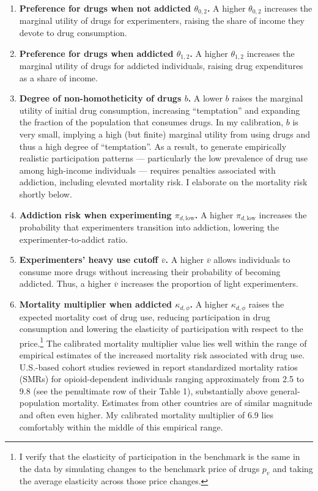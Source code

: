 \documentclass[parskip=full]{article}
\theoremstyle{plain}
\theoremstyle{definition}
\theoremstyle{remark}
\begin{document}
\begin{enumerate}
\item \textbf{Preference for drugs when not addicted $\theta_{0,2}$.} A higher $\theta_{0,2}$ increases the marginal utility of drugs for experimenters, raising the share of income they devote to drug consumption.

\item \textbf{Preference for drugs when addicted $\theta_{1,2}$.} A higher $\theta_{1,2}$ increases the marginal utility of drugs for addicted individuals, raising drug expenditures as a share of income.

\item \textbf{Degree of non-homotheticity of drugs $b$.} 
A lower $b$ raises the marginal utility of initial drug consumption, increasing ``temptation'' and expanding the fraction of the population that consumes drugs. In my calibration, $b$ is very small, implying a high (but finite) marginal utility from using drugs and thus a high degree of ``temptation''. As a result, to generate empirically realistic participation patterns — particularly the low prevalence of drug use among high-income individuals — requires penalties associated with addiction, including elevated mortality risk. I elaborate on the mortality risk shortly below.

\item \textbf{Addiction risk when experimenting $\pi_{d,\text{low}}$.} A higher $\pi_{d,\text{low}}$ increases the probability that experimenters transition into addiction, lowering the experimenter-to-addict ratio.

\item \textbf{Experimenters' heavy use cutoff $\overline{v}$.} A higher $\overline{v}$ allows individuals to consume more drugs without increasing their probability of becoming addicted. Thus, a higher $\overline{v}$ increases the proportion of light experimenters.

\item \textbf{Mortality multiplier when addicted $\kappa_{d,\phi}$.} A higher $\kappa_{d,\phi}$ raises the expected mortality cost of drug use, reducing participation in drug consumption and lowering the elasticity of participation with respect to the price.\footnote{I verify that the elasticity of participation in the benchmark is the same in the data by simulating changes to the benchmark price of drugs $p_v$ and taking the average elasticity across those price changes.} The calibrated mortality multiplier value lies well within the range of empirical estimates of the increased mortality risk associated with drug use. U.S.-based cohort studies reviewed in \citet{degenhardt2010mortality} report standardized mortality ratios (SMRs) for opioid-dependent individuals ranging approximately from 2.5 to 9.8 (see the penultimate row of their Table 1), substantially above general-population mortality. Estimates from other countries are of similar magnitude and often even higher. My calibrated mortality multiplier of 6.9 lies comfortably within the middle of this empirical range.


\end{enumerate}
\end{document}
